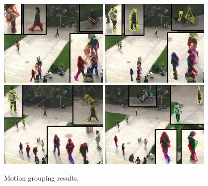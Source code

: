 \begin{figure}
\centering
\includegraphics[width=0.47\textwidth,bb=0 0 720 576]{a16.jpg}
\includegraphics[width=0.47\textwidth,bb=0 0 720 576]{a26.jpg}\\
\includegraphics[width=0.47\textwidth,bb=0 0 720 576]{a71.jpg}
\includegraphics[width=0.47\textwidth,bb=0 0 720 576]{a116.jpg}
\caption[Motion grouping results]{Motion grouping results.}
\label{fig:mgr}
\end{figure}


